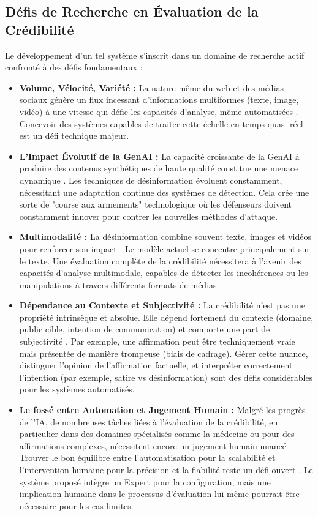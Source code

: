 \documentclass[9pt,twocolumn,french]{article}
\begin{document}
\subsection{Défis de Recherche en Évaluation de la Crédibilité}

Le développement d'un tel système s'inscrit dans un domaine de recherche actif confronté à des défis fondamentaux :

\begin{itemize}
    \item \textbf{Volume, Vélocité, Variété :} La nature même du web et des médias sociaux génère un flux incessant d'informations multiformes (texte, image, vidéo) à une vitesse qui défie les capacités d'analyse, même automatisées \citep{Hagag2023The, Loth2024}. Concevoir des systèmes capables de traiter cette échelle en temps quasi réel est un défi technique majeur.
    \item \textbf{L'Impact Évolutif de la GenAI :} La capacité croissante de la GenAI à produire des contenus synthétiques de haute qualité constitue une menace dynamique \citep{Loth2024, Zhou2022A}. Les techniques de désinformation évoluent constamment, nécessitant une adaptation continue des systèmes de détection. Cela crée une sorte de "course aux armements" technologique où les défenseurs doivent constamment innover pour contrer les nouvelles méthodes d'attaque.
    \item \textbf{Multimodalité :} La désinformation combine souvent texte, images et vidéos pour renforcer son impact \citep{Loth2024, schema_claimreview}. Le modèle actuel se concentre principalement sur le texte. Une évaluation complète de la crédibilité nécessitera à l'avenir des capacités d'analyse multimodale, capables de détecter les incohérences ou les manipulations à travers différents formats de médias.
    \item \textbf{Dépendance au Contexte et Subjectivité :} La crédibilité n'est pas une propriété intrinsèque et absolue. Elle dépend fortement du contexte (domaine, public cible, intention de communication) et comporte une part de subjectivité \citep{Viviani2017, Pescuma2025}. Par exemple, une affirmation peut être techniquement vraie mais présentée de manière trompeuse (biais de cadrage). Gérer cette nuance, distinguer l'opinion de l'affirmation factuelle, et interpréter correctement l'intention (par exemple, satire vs désinformation) sont des défis considérables pour les systèmes automatisés.
    \item \textbf{Le fossé entre Automation et Jugement Humain :} Malgré les progrès de l'IA, de nombreuses tâches liées à l'évaluation de la crédibilité, en particulier dans des domaines spécialisés comme la médecine ou pour des affirmations complexes, nécessitent encore un jugement humain nuancé \citep{Nabozny2021, Hagag2023The, Pescuma2025}. Trouver le bon équilibre entre l'automatisation pour la scalabilité et l'intervention humaine pour la précision et la fiabilité reste un défi ouvert \citep{Sattar2016Claimeval}. Le système proposé intègre un Expert pour la configuration, mais une implication humaine dans le processus d'évaluation lui-même pourrait être nécessaire pour les cas limites.
\end{itemize}
\end{document}
